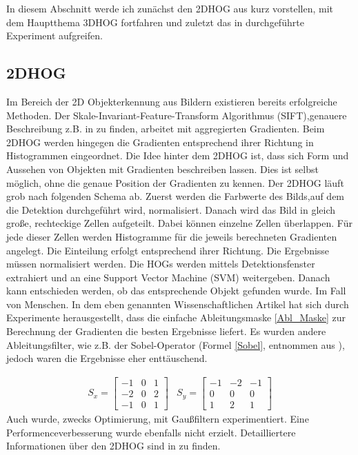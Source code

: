 In diesem Abschnitt werde ich zunächst den 2DHOG aus \cite{dalal2005histograms} kurz vorstellen, mit dem Hauptthema 3DHOG fortfahren und zuletzt das in \cite{scherer2010histograms} durchgeführte Experiment aufgreifen.

\subsection{2DHOG}
Im Bereich der 2D Objekterkennung aus Bildern existieren bereits erfolgreiche Methoden. Der Skale-Invariant-Feature-Transform Algorithmus (SIFT),genauere Beschreibung z.B. in \cite{Priese15}
zu finden, arbeitet mit aggregierten Gradienten. Beim 2DHOG werden hingegen die Gradienten entsprechend
ihrer Richtung in Histogrammen eingeordnet.
\newline
Die Idee hinter dem 2DHOG ist, dass sich Form und Aussehen von Objekten mit Gradienten beschreiben lassen.
Dies ist selbst möglich, ohne die genaue Position der Gradienten zu kennen. Der 2DHOG läuft grob nach folgenden Schema ab. Zuerst werden die Farbwerte des Bilds,auf dem die Detektion durchgeführt wird, normalisiert. Danach wird das Bild in gleich große, rechteckige Zellen aufgeteilt. Dabei können einzelne Zellen überlappen. Für jede dieser Zellen werden Histogramme für die jeweils berechneten Gradienten angelegt. Die Einteilung erfolgt entsprechend ihrer Richtung. Die Ergebnisse müssen normalisiert werden. Die HOGs werden mittels Detektionsfenster extrahiert und an eine Support Vector Machine (SVM) weitergeben. Danach kann entschieden werden, ob das entsprechende Objekt gefunden wurde. Im Fall von \cite{dalal2005histograms} Menschen. In dem eben genannten Wissenschaftlichen Artikel hat sich durch Experimente herausgestellt, dass die einfache Ableitungsmaske \ref{Abl_Maske} zur Berechnung der Gradienten die besten Ergebnisse liefert. 
Es wurden andere Ableitungsfilter, wie z.B. der Sobel-Operator (Formel \ref{Sobel}, entnommen aus \cite{Priese15}), jedoch waren die Ergebnisse eher enttäuschend. 

\begin{align}
\label{Sobel}
	S_x =	\begin{bmatrix}
				-1 & 0 & 1 \\
				-2 & 0 & 2 \\
				-1 & 0 & 1 
			\end{bmatrix}  &  
	S_y =	\begin{bmatrix}
				-1 & -2 & -1 \\
				 0 & 0 &   0 \\
				 1 & 2 &   1 
			\end{bmatrix}	
\end{align}
Auch wurde, zwecks Optimierung, mit Gaußfiltern experimentiert. Eine Performenceverbesserung wurde ebenfalls nicht erzielt. 
Detailliertere Informationen über den 2DHOG sind in \cite{dalal2005histograms} zu finden.

